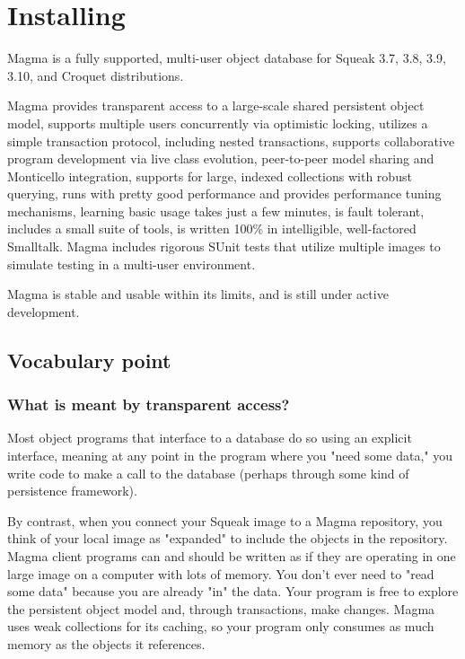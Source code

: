 \documentclass[a4paper,10pt,twoside]{book}
\begin{document}
\fi
\sloppy
\chapter{Installing }\label{cha:basic}


Magma is a fully supported, multi-user object database for Squeak 3.7, 3.8, 3.9, 3.10, and Croquet distributions. 

Magma provides transparent access to a large-scale shared persistent object model, 
supports multiple users concurrently via optimistic locking,  utilizes a simple transaction protocol, including nested transactions, supports collaborative program development via live class evolution, peer-to-peer model sharing and Monticello integration,  supports for large, indexed collections with robust querying, runs with pretty good performance and provides performance tuning mechanisms, 
learning basic usage takes just a few minutes,  is fault tolerant,  includes a small suite of tools, is written 100\% in intelligible, well-factored Smalltalk.
Magma  includes rigorous SUnit tests that utilize multiple images to simulate testing in a multi-user environment.

Magma is stable and usable within its limits, and is still under active development.

\section{Vocabulary point}

\subsection{What is meant by transparent access?}

Most object programs that interface to a database do so using an explicit interface, meaning at any point in the program where you "need some data," you write code to make a call to the database (perhaps through some kind of persistence framework).

By contrast, when you connect your Squeak image to a Magma repository, you think of your local image as "expanded" to include the objects in the repository. Magma client programs can and should be written as if they are operating in one large image on a computer with lots of memory. You don't ever need to "read some data" because you are already "in" the data. Your program is free to explore the persistent object model and, through transactions, make changes. Magma uses weak collections for its caching, so your program only consumes as much memory as the objects it references.
\end{document}
